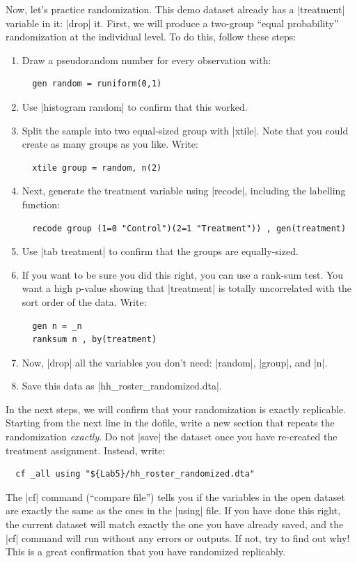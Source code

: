 \documentclass{tufte-handout}
\begin{document}
Now, let’s practice randomization.
This demo dataset already has a |treatment| variable in it: |drop| it.
First, we will produce a two-group “equal probability”
randomization at the individual level. To do this, follow these steps:
\begin{enumerate}
  \item Draw a pseudorandom number for every observation with:
\begin{Verbatim}
  gen random = runiform(0,1)
\end{Verbatim}
  \item Use |histogram random| to confirm that this worked.
  \item Split the sample into two equal-sized group with |xtile|.
  Note that you could create as many groups as you like. Write:
\begin{Verbatim}
  xtile group = random, n(2)
\end{Verbatim}
  \item Next, generate the treatment variable using |recode|, including the  labelling function:
\begin{Verbatim}
  recode group (1=0 "Control")(2=1 "Treatment")) , gen(treatment)
\end{Verbatim}
  \item Use |tab treatment| to confirm that the groups are equally-sized.
  \item If you want to be sure you did this right, you can use a rank-sum test.
  You want a high p-value showing that |treatment| is
  totally uncorrelated with the sort order of the data. Write:
\begin{Verbatim}
  gen n = _n
  ranksum n , by(treatment)
\end{Verbatim}
  \item Now, |drop| all the variables you don’t need: |random|, |group|, and |n|.
  \item Save this data as |hh_roster_randomized.dta|.
\end{enumerate}

In the next steps, we will confirm that your randomization is exactly replicable.
Starting from the next line in the dofile,
write a new section that repeats the randomization \textit{exactly}.
Do not |save| the dataset once you have re-created the treatment assignment.
Instead, write:
\begin{Verbatim}
  cf _all using "${Lab5}/hh_roster_randomized.dta"
\end{Verbatim}
The |cf| command (``compare file'') tells you if the variables in the open dataset
are exactly the same as the ones in the |using| file.
If you have done this right,
the current dataset will match exactly the one you have
already saved, and the |cf| command will run without any errors or outputs.
If not, try to find out why!
This is a great confirmation that you have randomized replicably.
\end{document}
